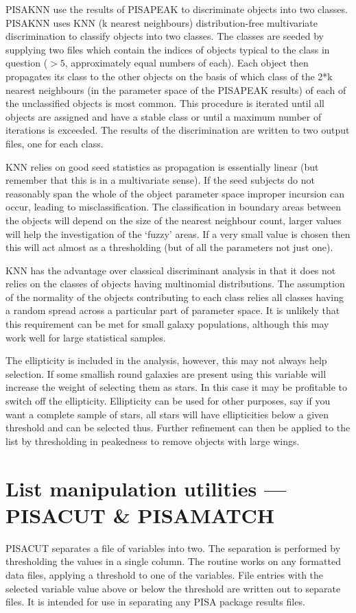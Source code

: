 PISAKNN use the results of PISAPEAK to discriminate objects into two
classes. PISAKNN uses KNN (k nearest neighbours) distribution-free
multivariate discrimination to classify objects into two classes. The
classes are seeded by supplying two files which contain the indices of
objects typical to the class in question ($>5$, approximately equal
numbers of each). Each object then propagates its class to the other
objects on the basis of which class of the 2*k nearest neighbours (in
the parameter space of the PISAPEAK results) of each of the unclassified
objects is most common. This procedure is iterated until all objects are
assigned and have a stable class or until a maximum number of iterations
is exceeded. The results of the discrimination are written to two output
files, one for each class.

KNN relies on good seed statistics as propagation is essentially linear
(but remember that this is in a multivariate sense). If the seed
subjects do not reasonably span the whole of the object parameter space
improper incursion can occur, leading to misclassification. The
classification in boundary areas between the objects will depend on the
size of the nearest neighbour count, larger values will help the
investigation of the `fuzzy' areas. If a very small value is chosen then
this will act almost as a thresholding (but of all the parameters not
just one).

KNN has the advantage over classical discriminant analysis in that it
does not relies on the classes of objects having multinomial
distributions. The assumption of the normality of the objects
contributing to each class relies all classes having a random spread
across a particular part of parameter space. It is unlikely that this
requirement can be met for small galaxy populations, although this may
work well for large statistical samples.

The ellipticity is included in the analysis, however, this may not
always help selection. If some smallish round galaxies are present using
this variable will increase the weight of selecting them as stars. In
this case it may be profitable to switch off the ellipticity. 
Ellipticity can be used for other purposes, say if you want a complete
sample of stars, all stars will have ellipticities below a given
threshold and can be selected thus. Further refinement can then be
applied to the list by thresholding in peakedness to remove objects with
large wings. 

\section{List manipulation utilities --- PISACUT \& PISAMATCH}
PISACUT separates a file of variables into two. The separation is
performed by thresholding the values in a single column. The routine
works on any formatted data files, applying a threshold to one of the
variables. File entries with the selected variable value above or below
the threshold are written out to separate files. It is intended for use
in separating any PISA package results files.

